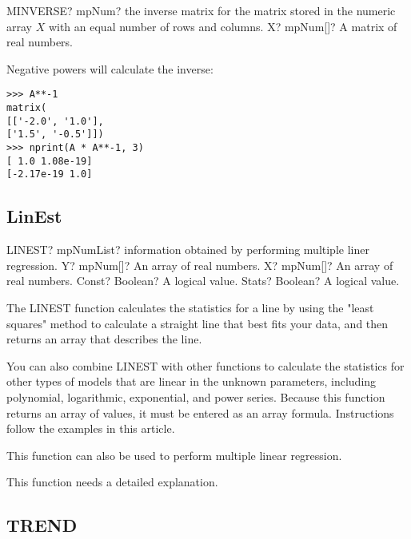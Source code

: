 \begin{mpFunctionsExtract}
	\mpWorksheetFunctionOneNotImplemented
	{MINVERSE? mpNum? the  inverse matrix for the matrix stored in the numeric array  $X$ with an equal number of rows and columns.}
	{X? mpNum[]? A matrix of real numbers.}
\end{mpFunctionsExtract}


Negative powers will calculate the inverse:

\begin{lstlisting}
>>> A**-1
matrix(
[['-2.0', '1.0'],
['1.5', '-0.5']])
>>> nprint(A * A**-1, 3)
[ 1.0 1.08e-19]
[-2.17e-19 1.0]
\end{lstlisting}






\subsection{LinEst}
\label{LinEst}

\begin{mpFunctionsExtract}
	\mpWorksheetFunctionFourNotImplemented
	{LINEST? mpNumList? information obtained by performing multiple liner regression.}
	{Y? mpNum[]? An array of real numbers.}
	{X? mpNum[]? An array of real numbers.}
	{Const? Boolean? A logical value.}
	{Stats? Boolean? A logical value.}
\end{mpFunctionsExtract}



\vspace{0.3cm}
The LINEST function calculates the statistics for a line by using the "least squares" method to calculate a straight line that best fits your data, and then returns an array that describes the line. 

You can also combine LINEST with other functions to calculate the statistics for other types of models that are linear in the unknown parameters, including polynomial, logarithmic, exponential, and power series. Because this function returns an array of values, it must be entered as an array formula. Instructions follow the examples in this article.

This function can also be used to perform multiple linear regression.

This function needs a detailed explanation.



\subsection{TREND}

